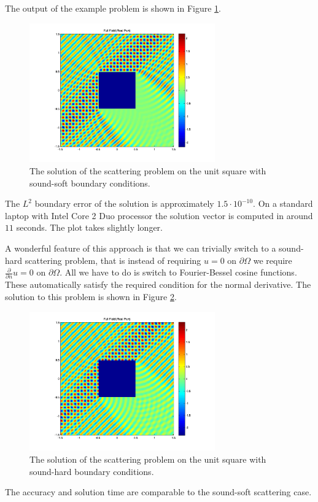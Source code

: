 The output of the example problem is shown in Figure \ref{fig:squareplot}.
\begin{figure}
\center
\includegraphics[width=8cm]{squareplot}
\caption{The solution of the scattering problem on the unit
  square with sound-soft boundary conditions.}
\label{fig:squareplot}
\end{figure}
The $L^2$ boundary error of the solution is approximately $1.5\cdot
10^{-10}$. On a standard laptop with Intel Core 2 Duo processor the
solution vector is computed in around $11$ seconds. The plot takes
slightly longer.

A wonderful feature of this approach is that we can trivially switch
to a sound-hard scattering problem, that is instead of requiring $u=0$
on $\partial\Omega$ we require $\frac{\partial}{\partial n} u=0$ on
$\partial\Omega$. All we have to do is switch to Fourier-Bessel cosine
functions. These automatically satisfy the required condition for the
normal derivative. The solution to this problem is shown in Figure
\ref{fig:squareplot2}.
\begin{figure}
\center
\includegraphics[width=8cm]{squareplot2}
\caption{The solution of the scattering problem on the unit
  square with sound-hard boundary conditions.}
\label{fig:squareplot2}
\end{figure}
The accuracy and solution time are comparable to the sound-soft
scattering case.


